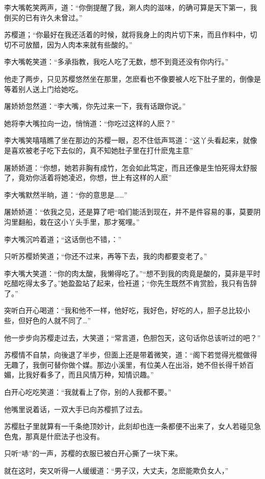\documentclass[12pt,oneside]{book}
\begin{document}
李大嘴乾笑两声，道：``你倒提醒了我，涮人肉的滋味，的确可算是天下第一，我倒买的已有许久未曾过。''

苏樱道；``你最好在我还活着的时候，就将我身上的肉片切下来，而且作料中，切切不可放醋，因为人肉本来就有些酸的。''

李大嘴乾笑道：``多承指教，我吃人吃了无数，想不到竟还没有你内行。''

他走了两步，只见苏樱悠然坐在那里，怎麽看也不像要被人吃下肚子里的，倒像是等着别人送上门给她吃。

屠娇娇忽然道：``李大嘴，你先过来一下，我有话跟你说。''

她将李大嘴拉向一边，悄悄道：``你吃过这样的人麽？''

李大嘴笑嘻嘻瞧了坐在那边的苏樱一眼，忍不住低声骂道：``这丫头看起来，就像是喜欢被老子吃下去似的，真不知她肚子里在打什麽鬼主意''

屠娇娇道：``你想，她若非胸有成竹，怎会如此笃定，而且还像是生怕死得太舒服了，竟劝你活着将她凌迟，你想，世上有这样的人麽''

李大嘴默然半晌，道：``你的意思是\ldots\ldots{}''

屠娇娇道：``依我之见，还是算了吧``咱们能活到现在，并不是件容易的事，莫要阴沟里翻船，栽在这小丫头手里，那才冤哩。''

李大嘴沉吟着道；``这话倒也不错，：''

只听苏樱娇笑道；``你还不过来，再等下去，我的肉都要变老了。''

李大嘴大笑道：``你的肉太酸，我懒得吃了。''``想不到我的肉竟是酸的，莫非是平时吃醋吃得太多了。''她盈盈站了起来，俭衽道；``你先生既然不肯赏脸，我只有告辞了。''

突听白开心喝道：``我和他不一样，他好吃，我好色，好吃的人，胆子总比较小些，但好色的人就不同了\ldots{}''

他一步步向苏樱走过去，大笑道；``常言道，色胆包天，这句话你总该听过的吧？''

苏樱情不自禁，向後退了半步，但面上还是带着微笑，道：``阁下若觉得光棍做得无趣了，我倒可替你做个媒。那边小溪里，有位美人在出浴，她不但长得千娇百媚，比我好看多了，而且风情万种，知情识趣。''

白开心吃吃笑道：``我就看上了你，别的人我都不要。''

他嘴里说着话，一双大手已向苏樱抓了过去。

苏樱肚子里就算有一千条绝顶妙计，此刻却也连一条都便不出来了，女人若碰见急色鬼，那真是什麽法子也没有。

只听``哧''的一声，苏樱的衣服已被白开心撕了一块下来。

就在这时，突又听得一人缓缓道：``男子汉，大丈夫，怎麽能欺负女人，''
\end{document}
